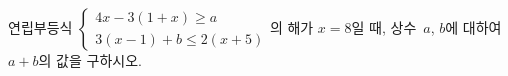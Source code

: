 연립부등식 $\begin{cases} 4x-3(1+x)\ge a \\ 3(x-1)+b\le 2(x+5) \end{cases}$의 해가 $x=8$일 때, 상수~$a$, $b$에 대하여 $a+b$의 값을 구하시오.
